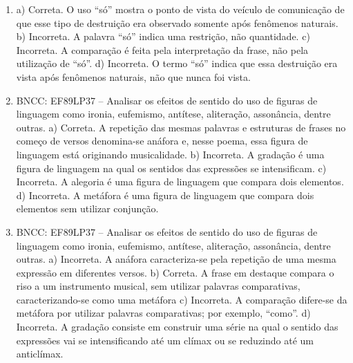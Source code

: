 
\begin{enumerate}
\item
a) Correta. O uso ``só'' mostra o ponto de vista do veículo de
comunicação de que esse tipo de destruição era observado somente após
fenômenos naturais. b) Incorreta. A palavra ``só'' indica uma restrição, não quantidade. c) Incorreta. A comparação é feita pela interpretação da frase, não pela utilização de ``só''. d) Incorreta. O termo ``só'' indica que essa destruição era vista após fenômenos naturais, não que nunca foi vista.

\item
BNCC: EF89LP37 -- Analisar os efeitos de sentido do uso de figuras de
linguagem como ironia, eufemismo, antítese, aliteração, assonância,
dentre outras. a) Correta. A repetição das mesmas palavras e estruturas de frases no começo de versos denomina-se anáfora e, nesse poema, essa figura de linguagem está originando musicalidade. b) Incorreta. A gradação é uma figura de linguagem na qual os sentidos das expressões se intensificam. c) Incorreta. A alegoria é uma figura de linguagem que compara dois elementos. d) Incorreta. A metáfora é uma figura de linguagem que compara dois elementos sem utilizar conjunção.

\item
BNCC: EF89LP37 -- Analisar os efeitos de sentido do uso de figuras de linguagem como ironia, eufemismo, antítese, aliteração, assonância, dentre outras. a) Incorreta. A anáfora caracteriza-se pela repetição de uma mesma expressão em diferentes versos. b) Correta. A frase em destaque compara o riso a um instrumento musical, sem utilizar palavras comparativas, caracterizando-se como uma metáfora c) Incorreta. A comparação difere-se da metáfora por utilizar palavras comparativas; por exemplo, ``como''. d) Incorreta. A gradação consiste em construir uma série na qual o sentido das expressões vai se intensificando até um clímax ou se
reduzindo até um anticlímax.
\end{enumerate}


